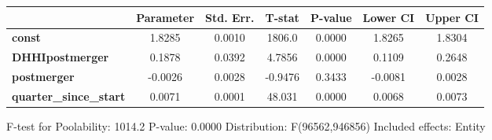 \documentclass{report}
\begin{document}
\begin{center}
\begin{tabular}{lcccccc}
                               & \textbf{Parameter} & \textbf{Std. Err.} & \textbf{T-stat} & \textbf{P-value} & \textbf{Lower CI} & \textbf{Upper CI}  \\
\midrule
\textbf{const}                 &       1.8285       &       0.0010       &      1806.0     &      0.0000      &       1.8265      &       1.8304       \\
\textbf{DHHIpostmerger}        &       0.1878       &       0.0392       &      4.7856     &      0.0000      &       0.1109      &       0.2648       \\
\textbf{postmerger}            &      -0.0026       &       0.0028       &     -0.9476     &      0.3433      &      -0.0081      &       0.0028       \\
\textbf{quarter\_since\_start} &       0.0071       &       0.0001       &      48.031     &      0.0000      &       0.0068      &       0.0073       \\
\bottomrule
\end{tabular}
\end{center}

F-test for Poolability: 1014.2 \newline
 P-value: 0.0000 \newline
 Distribution: F(96562,946856) \newline
  \newline
 Included effects: Entity
\end{document}
